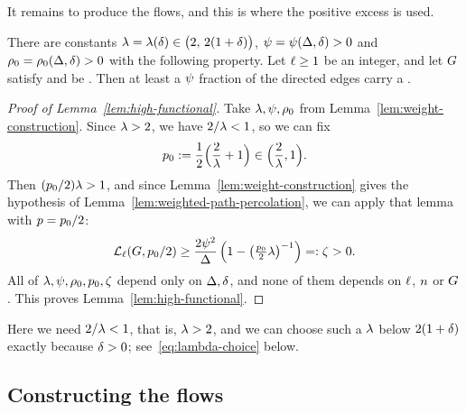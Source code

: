 It remains to produce the flows, and this is where the positive excess is used.

\begin{lemma}\label{lem:weight-construction}
There are constants \(\lambda=\lambda(\delta)\in\bigl(2,\,2(1+\delta)\bigr)\),
\(\psi=\psi(\Delta,\delta)>0\) and \(\rho_0=\rho_0(\Delta,\delta)>0\) with
the following property. Let \(\ell\ge1\) be an integer, and let \(G\) satisfy
\Hyp{} and be \loctree{\plen}{\nontreez}. Then at least a \(\psi\) fraction of
the directed edges carry a \flowt{\brnum}{\gfrac}.
\end{lemma}

\begin{proof}[Proof of Lemma~\ref{lem:high-functional}]
Take \(\lambda,\psi,\rho_0\) from Lemma~\ref{lem:weight-construction}. Since
\(\lambda>2\), we have \(2/\lambda<1\), so we can fix
\[
  p_0:=\frac12\Bigl(\frac{2}{\lambda}+1\Bigr)\in\Bigl(\frac2{\lambda},1\Bigr).
\]
Then \((p_0/2)\lambda>1\), and since Lemma~\ref{lem:weight-construction}
gives the hypothesis of Lemma~\ref{lem:weighted-path-percolation}, we can apply
that lemma with \(p=p_0/2\):
\[
  \mathcal{L}_{\ell}(G,p_0/2)
  \ge\frac{2\psi^2}{\Delta}
       \left(1-\left(\tfrac{p_0}{2}\lambda\right)^{-1}\right)=:\zeta>0 .
\]
All of \(\lambda,\psi,\rho_0,p_0,\zeta\) depend only on
\(\Delta,\delta\), and none of them depends on \(\ell\), \(n\) or \(G\).
This proves Lemma~\ref{lem:high-functional}.
\end{proof}

Here we need \(2/\lambda<1\), that is, \(\lambda>2\), and we can choose such a
\(\lambda\) below \(2(1+\delta)\) exactly because \(\delta>0\);
see~\eqref{eq:lambda-choice} below.

\subsection{Constructing the flows}


